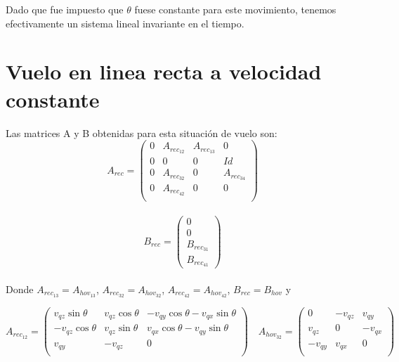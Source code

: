 Dado que fue impuesto que $\theta$ fuese constante para este movimiento, tenemos efectivamente un sistema lineal invariante en el tiempo.

\section{Vuelo en linea recta a velocidad constante}

Las matrices A y B obtenidas para esta situaci\'on de vuelo son:
\begin{equation}
\label{eq:Arec}
A_{rec}=\left(\begin{array}{cccc}
0 & A_{rec_{12}} & A_{rec_{13}} & 0 \\
0 & 0 & 0      & Id\\
0 & A_{rec_{32}} & 0 & A_{rec_{34}}\\
0 &  A_{rec_{42}}       &  0  & 0 \\    
\end{array}\right)
\end{equation}\\


\begin{equation}
\label{eq:Brec}
B_{rec}=\left(\begin{array}{c}
0\\
0\\
B_{rec_{31}}\\
B_{rec_{41}} 
\end{array}\right)
\end{equation}\\

Donde $A_{rec_{13}}=A_{hov_{13}}$, $A_{rec_{32}}=A_{hov_{32}}$, $A_{rec_{42}}=A_{hov_{42}}$,    $B_{rec}=B_{hov}$ y 

\begin{equation}
A_{rec_{12}}=\left(\begin{array}{ccc}
v_{qz}\sin\theta & v_{qz}\cos\theta & -v_{qy}\cos\theta-v_{qx}\sin\theta \\
-v_{qz}\cos\theta & v_{qz}\sin\theta & v_{qx}\cos\theta-v_{qy}\sin\theta \\
v_{qy} & -v_{qz} &0\\
\end{array}\right) \quad 
A_{hov_{32}}=\left(\begin{array}{ccc}
0 & -v_{qz} & v_{qy} \\
v_{qz} & 0 & -v_{qx}\\
-v_{qy} & v_{qx} &0\\
\end{array}\right)
\end{equation}

